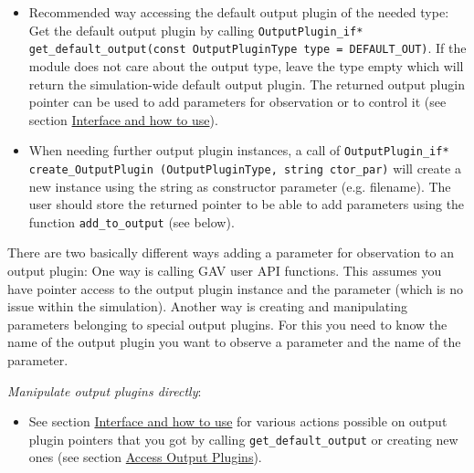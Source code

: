 \begin{itemize}
  \item Recommended way accessing the default output plugin of the needed type: \newline
     Get the default output plugin by calling
     \lstinline[language=TeX]|OutputPlugin_if* get_default_output(const OutputPluginType type = DEFAULT_OUT)|.
     If the module does not care about the output type, leave the type empty which will return the simulation-wide default output plugin. The returned output plugin pointer can be used to add parameters for observation or to control it (see section \hyperlink{InterfaceAndHowToUse}{Interface and how to use}).

  \item When needing further output plugin instances, a call of \lstinline|OutputPlugin_if* create_OutputPlugin (OutputPluginType, string ctor_par)| will create a new instance using the string as constructor parameter (e.g. filename). The user should store the returned pointer to be able to add parameters using the function \lstinline|add_to_output| (see below).
  
\end{itemize}


There are two basically different ways adding a parameter for observation to an output plugin: One way is calling GAV user API functions. This assumes you have pointer access to the output plugin instance and the parameter (which is no issue within the simulation). Another way is creating and manipulating parameters belonging to special output plugins. For this you need to know the name of the output plugin you want to observe a parameter and the name of the parameter.

{\em Manipulate output plugins directly}:
\begin{itemize}
	\item See section \hyperlink{InterfaceAndHowToUse}{Interface and how to use} for various actions possible on output plugin pointers that you got by calling \lstinline|get_default_output| or creating new ones (see section \hyperlink{AccessOutputPlugins}{Access Output Plugins}).
\end{itemize}

